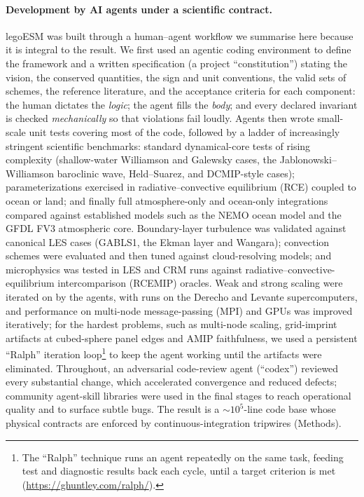 \documentclass[11pt]{article}
\begin{document}
\paragraph{Development by AI agents under a scientific contract.}
legoESM was built through a human--agent workflow we summarise here because it is integral to
the result. We first used an agentic coding environment to define the framework and a written
specification (a project ``constitution'') stating the vision, the conserved quantities, the
sign and unit conventions, the valid sets of schemes, the reference literature, and the
acceptance criteria for each component: the human dictates the \emph{logic}; the agent fills
the \emph{body}; and every declared invariant is checked \emph{mechanically} so that violations
fail loudly. Agents then wrote small-scale unit tests covering most of the code, followed by a
ladder of increasingly stringent scientific benchmarks: standard dynamical-core tests of
rising complexity (shallow-water Williamson and Galewsky cases, the Jablonowski--Williamson
baroclinic wave, Held--Suarez, and DCMIP-style cases); parameterizations exercised in
radiative--convective equilibrium (RCE) coupled to ocean or land; and finally full
atmosphere-only and ocean-only integrations compared against established models such as the
NEMO ocean model and the GFDL FV3 atmospheric core. Boundary-layer
turbulence was validated against canonical LES cases (GABLS1, the Ekman layer and Wangara);
convection schemes were evaluated and then tuned against cloud-resolving models; and
microphysics was tested in LES and CRM runs against radiative--convective-equilibrium
intercomparison (RCEMIP) oracles. Weak and strong scaling were iterated on by the agents, with runs
on the Derecho and Levante supercomputers, and performance on multi-node message-passing (MPI) and
GPUs was improved iteratively; for the hardest problems, such as multi-node scaling, grid-imprint
artifacts at cubed-sphere panel edges and AMIP faithfulness, we used a persistent ``Ralph'' iteration
loop\footnote{The ``Ralph'' technique runs an agent repeatedly on the same task, feeding test
and diagnostic results back each cycle, until a target criterion is met
(\url{https://ghuntley.com/ralph/}).} to keep the agent working until the artifacts were
eliminated. Throughout, an adversarial code-review
agent (``codex'') reviewed every substantial change, which accelerated convergence and reduced
defects; community agent-skill libraries were used in the final stages to reach operational
quality and to surface subtle bugs. The result is a $\sim$$10^5$-line code base whose physical
contracts are enforced by continuous-integration tripwires (Methods).
\end{document}
